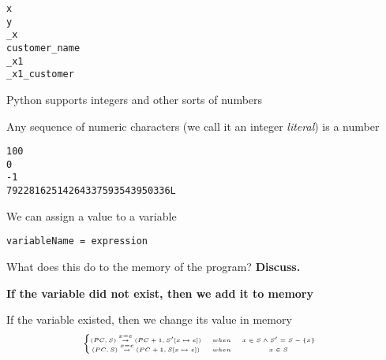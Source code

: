 \documentclass{beamer}
\begin{document}
\begin{frame}[fragile]
\begin{lstlisting}
x
y
_x
customer_name
_x1
_x1_customer
\end{lstlisting}
\end{frame}

\begin{slide}{
\item Python supports integers and other sorts of numbers
\item Any sequence of numeric characters (we call it an integer \textit{literal}) is a number
}\end{slide}

\begin{frame}[fragile]
\begin{lstlisting}
100
0
-1
79228162514264337593543950336L
\end{lstlisting}
\end{frame}

\begin{slide}{
\item We can assign a value to a variable
\item \texttt{variableName = expression}
\item What does this do to the memory of the program? \textbf{Discuss.}
\pause
\item \textbf{If the variable did not exist, then we add it to memory}
\item If the variable existed, then we change its value in memory 
$$
\tiny
\left\{
\begin{matrix}
(PC,S) \overset{x = e}{\rightarrow} (PC+1,S'[x \mapsto e]) &when& x \in S \wedge S' = S - \{x\} & \\
(PC,S) \overset{x = e}{\rightarrow} (PC+1,S[x \mapsto e]) &when& x \in S& \\
\end{matrix}
\right.
$$
}\end{slide}

\end{document}
